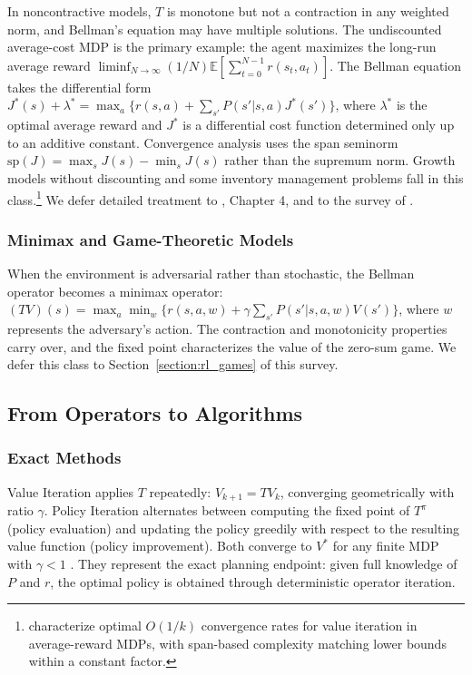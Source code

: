 In noncontractive models, $T$ is monotone but not a contraction in any weighted norm, and Bellman's equation may have multiple solutions. The undiscounted average-cost MDP is the primary example: the agent maximizes the long-run average reward $\liminf_{N \to \infty} (1/N) \mathbb{E}\left[\sum_{t=0}^{N-1} r(s_t, a_t)\right]$. The Bellman equation takes the differential form $J^*(s) + \lambda^* = \max_{a} \{r(s,a) + \sum_{s'} P(s'|s,a) J^*(s')\}$, where $\lambda^*$ is the optimal average reward and $J^*$ is a differential cost function determined only up to an additive constant. Convergence analysis uses the span seminorm $\text{sp}(J) = \max_s J(s) - \min_s J(s)$ rather than the supremum norm. Growth models without discounting and some inventory management problems fall in this class.\footnote{\citet{lee2025optimal} characterize optimal $O(1/k)$ convergence rates for value iteration in average-reward MDPs, with span-based complexity matching lower bounds within a constant factor.} We defer detailed treatment to \citet{bertsekas2022}, Chapter 4, and to the survey of \citet{bertsekas2025}.

\subsubsection{Minimax and Game-Theoretic Models}

When the environment is adversarial rather than stochastic, the Bellman operator becomes a minimax operator: $(TV)(s) = \max_{a} \min_{w} \{r(s,a,w) + \gamma \sum_{s'} P(s'|s,a,w) V(s')\}$, where $w$ represents the adversary's action. The contraction and monotonicity properties carry over, and the fixed point characterizes the value of the zero-sum game. We defer this class to Section~\ref{section:rl_games} of this survey.


\subsection{From Operators to Algorithms}
\label{sec:operators_to_algorithms}

\subsubsection{Exact Methods}

Value Iteration applies $T$ repeatedly: $V_{k+1} = TV_k$, converging geometrically with ratio $\gamma$. Policy Iteration alternates between computing the fixed point of $T^\pi$ (policy evaluation) and updating the policy greedily with respect to the resulting value function (policy improvement). Both converge to $V^*$ for any finite MDP with $\gamma < 1$ \citep{sutton2018}. They represent the exact planning endpoint: given full knowledge of $P$ and $r$, the optimal policy is obtained through deterministic operator iteration.

